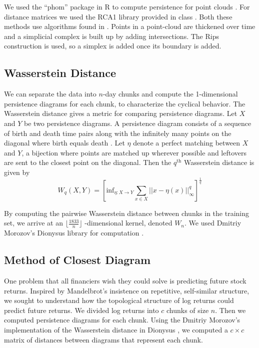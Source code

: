\documentclass{article}
\begin{document}
We used the ``phom'' package in R to compute persistence for point clouds \cite{phom}. For distance matrices we used the RCA1 library provided in class \cite{TDA}. Both these methods use algorithms found in \cite{de2011}. Points in a point-cloud are thickened over time and a simplicial complex is built up by adding intersections. The Rips construction is used, so a simplex is added once its boundary is added.

\subsection{Wasserstein Distance}

We can separate the data into $n$-day chunks and compute the 1-dimensional persistence diagrams for each chunk, to characterize the cyclical behavior. The Wasserstein distance gives a metric for comparing persistence diagrams. Let $X$ and $Y$ be two persistence diagrams. A persistence diagram consists of a sequence of birth and death time pairs along with the infinitely many points on the diagonal where birth equals death . Let $\eta$ denote a perfect matching between $X$ and $Y$, a bijection where points are matched up wherever possible and leftovers are sent to the closest point on the diagonal. Then the $q^{\text{th}}$ Wasserstein distance is given by 
\[
W_q(X,Y) = \left[ \text{inf}_{\eta:X \rightarrow Y} \sum_{x \in X} || x  - \eta(x) ||^q_\infty \right]^{\frac{1}{q}}
\]

By computing the pairwise Wasserstein distance between chunks in the training set, we arrive at an $\lfloor \frac{1833}{n} \rfloor$ -dimensional kernel, denoted $W_n$. We used Dmitriy Morozov's Dionysus library for computation \cite{morozov2012}.

\newpage

\subsection{Method of Closest Diagram}
One problem that all financiers wish they could solve is predicting future stock returns. Inspired by Mandelbrot's insistence on repetitive, self-similar structure, we sought to understand how the topological structure of log returns could predict future returns. We divided log returns into $c$ chunks of size $n$. Then we computed persistence diagrams for each chunk. Using the Dmitriy Morozov's implementation of the Wasserstein distance in Dionysus \cite{morozov2012}, we computed a $c \times c$ matrix of distances between diagrams that represent each chunk.
\end{document}
